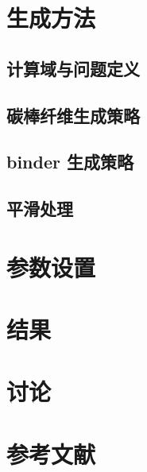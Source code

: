 \documentclass[twocolumn]{article}
\begin{document}
\section{生成方法}

\subsection{\textbf{计算域与问题定义}}



\subsection{\textbf{碳棒纤维生成策略}}



\subsection{\textbf{binder 生成策略}}



\subsection{\textbf{平滑处理}}



\section{参数设置}



\section{结果}



\section{讨论}

%



\section{参考文献}
\printbibliography[heading=none]
%
\end{document}
